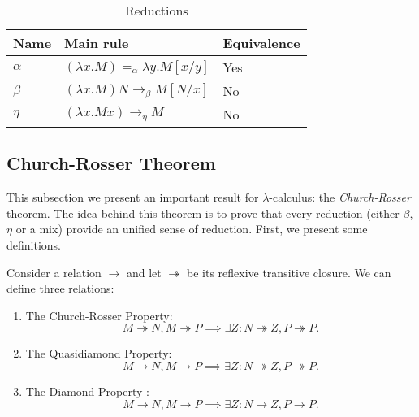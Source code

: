 
\begin{table}[h]
  \begin{center}
    \begin{tabular}{|l|l|l|}
      \hline
      Name & Main rule & Equivalence \\
            \hline
      $\alpha$ & $ (\lambda x. M) =_\alpha \lambda y. M[x/y]$& Yes\\
      $\beta$ & $(\lambda x.M)N \to_\beta M[N/x]$& No\\
      $\eta$ & ${\displaystyle (\lambda x.Mx) \to_\eta M }$& No\\
      \hline
    \end{tabular}
  \end{center}
  \caption{\label{tab:reductions}Reductions}
\end{table}


\subsection{Church-Rosser Theorem}

This subsection we present an important result for $\lambda$-calculus: the \emph{Church-Rosser} theorem. The idea behind this theorem is to prove that every reduction (either $\beta$, $\eta$ or a mix) provide an unified sense of reduction. First, we present some definitions.

\begin{definition}
  Consider a relation $\to$ and let $\twoheadrightarrow$ be its reflexive transitive closure. We can define three relations:

\begin{enumerate}
  \item The Church-Rosser Property: $$M\twoheadrightarrow N, M\twoheadrightarrow P \implies \exists Z : N\twoheadrightarrow Z, P\twoheadrightarrow P.$$
  \item The Quasidiamond Property: $$M\to N, M\to P \implies \exists Z : N\twoheadrightarrow Z, P\twoheadrightarrow P.$$
  \item The Diamond Property : $$M\to N, M\to P \implies \exists Z : N\to Z,P\to P.$$
  \end{enumerate}
\end{definition}

